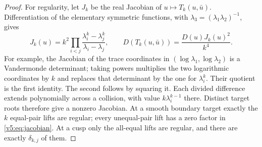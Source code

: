 \documentclass[UTF8,11pt]{ctexart}
\theoremstyle{definition}
\numberwithin{equation}{section}
\begin{document}
\begin{proof}
For regularity, let $J_k$ be the real Jacobian of
$u\mapsto T_k(u,\bar u)$. Differentiation of the elementary
symmetric functions, with $\lambda_3=(\lambda_1\lambda_2)^{-1}$,
gives
\begin{equation}\label{v5:eq:jacobian}
 J_k(u)=k^2\prod_{i<j}
       \frac{\lambda_i^k-\lambda_j^k}{\lambda_i-\lambda_j},
 \qquad
 D(T_k(u,\bar u))=\frac{D(u)J_k(u)^2}{k^4}.
\end{equation}
For example, the Jacobian of the trace coordinates in
$(\log\lambda_1,\log\lambda_2)$ is a Vandermonde determinant;
taking powers multiplies the two logarithmic coordinates by
$k$ and replaces that determinant by the one for $\lambda_i^k$.
Their quotient is the first identity. The second follows by
squaring it. Each divided difference extends polynomially
across a collision, with value $k\lambda_i^{k-1}$ there.
Distinct target roots therefore give a nonzero Jacobian.
At a smooth boundary target exactly the $k$ equal-pair lifts
are regular; every unequal-pair lift has a zero factor in
\eqref{v5:eq:jacobian}. At a cusp only the all-equal lifts are
regular, and there are exactly $\delta_{k,j}$ of them.
\end{proof}
\end{document}
